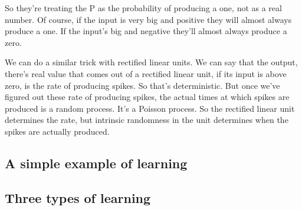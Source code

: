 \begin{multicols}{2}
\begin{footnotesize}
So they're treating the P as the probability of producing a one, not as a real number. Of course, if the input is very big and positive they will almost always produce a one. If the input's big and negative they'll almost always produce a zero.

We can do a similar trick with rectified linear units. We can say that the output, there's real value that comes out of a rectified linear unit, if its input is above zero, is the rate of producing spikes. So that's deterministic. But once we've figured out these rate of producing spikes, the actual times at which spikes are produced is a random process. It's a Poisson process. So the rectified linear unit determines the rate, but intrinsic randomness in the unit determines when the spikes are actually produced.
\end{footnotesize}
\end{multicols}


\subsection{A simple example of learning}


\subsection{Three types of learning}

